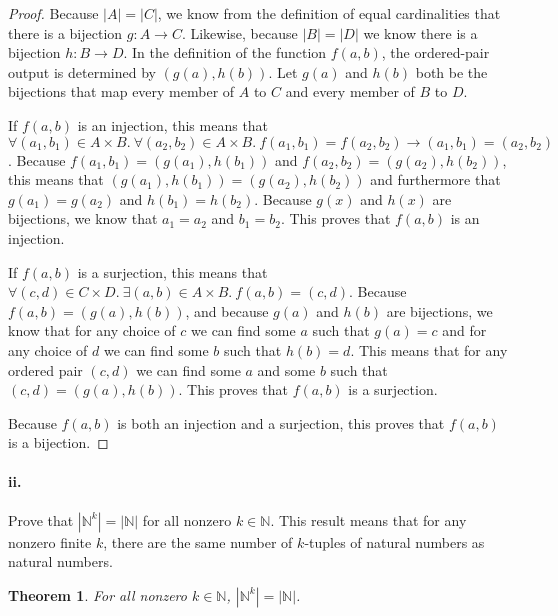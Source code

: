 \documentclass[10pt,letter]{article}
\newtheorem*{thm}{Theorem}
\begin{document}
\begin{proof} Because $|A| = |C|$, we know from the definition of equal cardinalities that there is a bijection $g: A \rightarrow C$. Likewise, because $|B| = |D|$ we know there is a bijection $h: B \rightarrow D$. In the definition of the function $f(a, b)$, the ordered-pair output is determined by $(g(a), h(b))$. Let $g(a)$ and $h(b)$ both be the bijections that map every member of $A$ to $C$ and every member of $B$ to $D$. 

If $f(a, b)$ is an injection, this means that $\forall (a_1, b_1) \in A \times B .\ \forall (a_2, b_2) \in A \times B .\ f(a_1, b_1) = f(a_2, b_2) \rightarrow (a_1, b_1) = (a_2, b_2)$. Because $f(a_1, b_1) = (g(a_1), h(b_1))$ and $f(a_2, b_2) = (g(a_2), h(b_2))$, this means that $(g(a_1), h(b_1)) = (g(a_2), h(b_2))$ and furthermore that $g(a_1) = g(a_2)$ and $h(b_1) = h(b_2)$. Because $g(x)$ and $h(x)$ are bijections, we know that $a_1 = a_2$ and $b_1 = b_2$. This proves that $f(a, b)$ is an injection.

If $f(a, b)$ is a surjection, this means that $\forall (c, d) \in C \times D .\ \exists (a, b) \in A \times B .\ f(a, b) = (c, d)$. Because $f(a, b) = (g(a), h(b))$, and because $g(a)$ and $h(b)$ are bijections, we know that for any choice of $c$ we can find some $a$ such that $g(a) = c$ and for any choice of $d$ we can find some $b$ such that $h(b) = d$. This means that for any ordered pair $(c, d)$ we can find some $a$ and some $b$ such that $(c, d) = (g(a), h(b))$. This proves that $f(a, b)$ is a surjection. 

Because $f(a, b)$ is both an injection and a surjection, this proves that $f(a, b)$ is a bijection.

\end{proof}

\paragraph{ii.} Prove that $|\mathbb{N}^k| = |\mathbb{N}|$ for all nonzero $k \in \mathbb{N}$. This result means that for any nonzero finite $k$, there are the same number of $k$-tuples of natural numbers as natural numbers.

\begin{thm} For all nonzero $k \in \mathbb{N}$, $|\mathbb{N}^k| = |\mathbb{N}|$. 
\end{thm}
\end{document}
